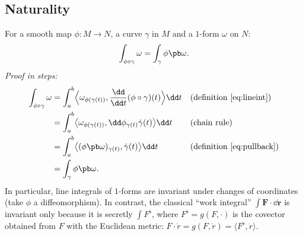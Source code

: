 \subsection{Naturality}\label{sec:naturality}

For a smooth map $\phi:M\to N$, a curve $\gamma$ in $M$ and a $1$-form $\omega$ on $N$:
\begin{equation}\label{eq:natural}
\int_{\phi\circ\gamma}\omega=\int_\gamma\phi\pb\omega .
\end{equation}
\emph{Proof in steps:}
\begin{align*}
\int_{\phi\circ\gamma}\omega&=\int_a^b\Bigl\langle\omega_{\phi(\gamma(t))},\frac{\dd}{\dd t}(\phi\circ\gamma)(t)\Bigr\rangle\dd t &&\text{(definition \eqref{eq:lineint})}\\
&=\int_a^b\bigl\langle\omega_{\phi(\gamma(t))},\dd\phi_{\gamma(t)}\dot\gamma(t)\bigr\rangle\dd t &&\text{(chain rule)}\\
&=\int_a^b\bigl\langle(\phi\pb\omega)_{\gamma(t)},\dot\gamma(t)\bigr\rangle\dd t &&\text{(definition \eqref{eq:pullback})}\\
&=\int_\gamma\phi\pb\omega .
\end{align*}
In particular, line integrals of $1$-forms are invariant under changes of coordinates (take $\phi$ a diffeomorphism). In contrast, the classical ``work integral'' $\int\mathbf F\cdot\dd\mathbf r$ is invariant only because it is secretly $\int F^\flat$, where $F^\flat=g(F,\cdot)$ is the covector obtained from $F$ with the Euclidean metric: $F\cdot\dot r=g(F,\dot r)=\langle F^\flat,\dot r\rangle$.
